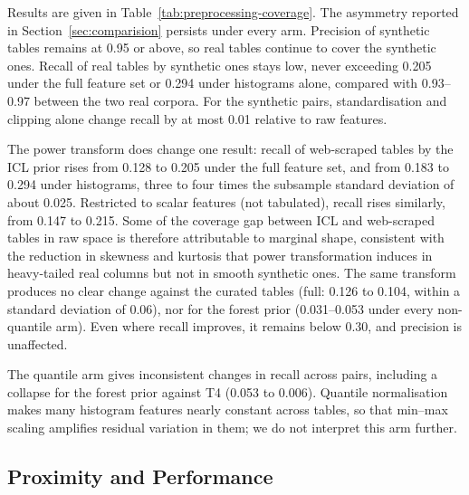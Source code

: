 \documentclass{article}
\begin{document}
Results are given in Table~\ref{tab:preprocessing-coverage}.
The asymmetry reported in Section~\ref{sec:comparision} persists under every arm.
Precision of synthetic tables remains at 0.95 or above, so real tables continue to cover the synthetic ones.
Recall of real tables by synthetic ones stays low, never exceeding 0.205 under the full feature set or 0.294 under histograms alone, compared with 0.93--0.97 between the two real corpora.
For the synthetic pairs, standardisation and clipping alone change recall by at most 0.01 relative to raw features.

The power transform does change one result: recall of web-scraped tables by the ICL prior rises from 0.128 to 0.205 under the full feature set, and from 0.183 to 0.294 under histograms, three to four times the subsample standard deviation of about 0.025.
Restricted to scalar features (not tabulated), recall rises similarly, from 0.147 to 0.215.
Some of the coverage gap between ICL and web-scraped tables in raw space is therefore attributable to marginal shape, consistent with the reduction in skewness and kurtosis that power transformation induces in heavy-tailed real columns but not in smooth synthetic ones.
The same transform produces no clear change against the curated tables (full: 0.126 to 0.104, within a standard deviation of 0.06), nor for the forest prior (0.031--0.053 under every non-quantile arm).
Even where recall improves, it remains below 0.30, and precision is unaffected.

The quantile arm gives inconsistent changes in recall across pairs, including a collapse for the forest prior against T4 (0.053 to 0.006).
Quantile normalisation makes many histogram features nearly constant across tables, so that min--max scaling amplifies residual variation in them; we do not interpret this arm further.

\subsection{Proximity and Performance}
\end{document}
